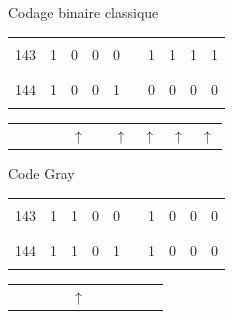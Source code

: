 \documentclass[11pt,a4paper]{article}
\begin{document}
\begin{table}[!ht]
  \centering
  \begin{minipage}{0.47\textwidth}
    \centering

Codage binaire classique

\smallskip

\bf
\begin{tabular}{ | C{1.5cm} | c c c c  m{0.25cm} c c c c | }
\hline
     &   &   &   &   & &   &   &   &   \\
143  & 1 & 0 & 0 & 0 & & 1 & 1 & 1 & 1 \\
     &   &   &   &   & &   &   &   &   \\
\hline
     &   &   &   &   & &   &   &   &   \\
144  & 1 & 0 & 0 & 1 & & 0 & 0 & 0 & 0 \\
     &   &   &   &   & &   &   &   &   \\
\hline
\end{tabular}
%
\begin{tabular}{   C{1.5cm}   c c c c  m{0.25cm} c c c c }
     & \phantom{1}  & \phantom{1} & \phantom{1} & $\uparrow$ & & $\uparrow$ & $\uparrow$ & $\uparrow$ & $\uparrow$ \\
\end{tabular}

  \end{minipage}
  \hfillx
  \begin{minipage}{0.47\textwidth}
    \centering

Code Gray

\smallskip

\bf
\begin{tabular}{ | C{1.5cm} | c c c c  m{0.25cm} c c c c | }
\hline
     &   &   &   &   & &   &   &   &   \\
143  & 1 & 1 & 0 & 0 & & 1 & 0 & 0 & 0 \\
     &   &   &   &   & &   &   &   &   \\
\hline
     &   &   &   &   & &   &   &   &   \\
144  & 1 & 1 & 0 & 1 & & 1 & 0 & 0 & 0 \\
     &   &   &   &   & &   &   &   &   \\
\hline
\end{tabular}
%
\begin{tabular}{   C{1.5cm}   c c c c  m{0.25cm} c c c c }
     & \phantom{1}  & \phantom{1} & \phantom{1} & $\uparrow$ & & \phantom{1} & \phantom{1} & \phantom{1} & \phantom{1} \\
\end{tabular}

  \end{minipage}
\end{table}
\end{document}

